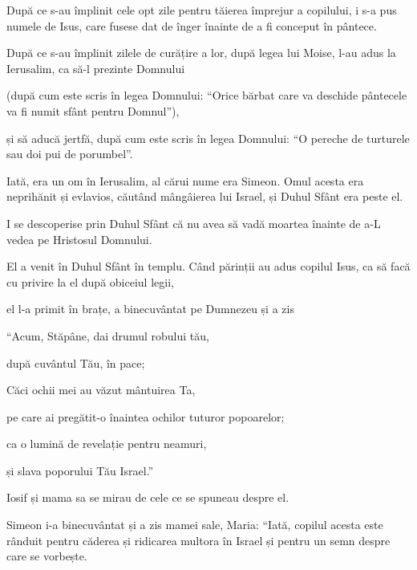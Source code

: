 {\par }{\PP {}După ce s-au împlinit cele opt zile pentru tăierea împrejur a copilului, i s-a pus numele de Isus, care fusese dat de înger înainte de a fi conceput în pântece.


\par }{\PP {}După ce s-au împlinit zilele de curățire a lor, după legea lui Moise, l-au adus la Ierusalim, ca să-l prezinte Domnului

(după cum este scris în legea Domnului: “Orice bărbat care va deschide pântecele va fi numit sfânt pentru Domnul”),

și să aducă jertfă, după cum este scris în legea Domnului: “O pereche de turturele sau doi pui de porumbel”.


\par }{\PP {}Iată, era un om în Ierusalim, al cărui nume era Simeon. Omul acesta era neprihănit și evlavios, căutând mângâierea lui Israel, și Duhul Sfânt era peste el.

I se descoperise prin Duhul Sfânt că nu avea să vadă moartea înainte de a-L vedea pe Hristosul Domnului.

El a venit în Duhul Sfânt în templu. Când părinții au adus copilul Isus, ca să facă cu privire la el după obiceiul legii,

el l-a primit în brațe, a binecuvântat pe Dumnezeu și a zis


\par }{\Q {}“Acum, Stăpâne, dai drumul robului tău,

\par }{\QB după cuvântul Tău, în pace;


\par }{\Q {}Căci ochii mei au văzut mântuirea Ta,


\par }{\QB {}pe care ai pregătit-o înaintea ochilor tuturor popoarelor;


\par }{\Q {}ca o lumină de revelație pentru neamuri,

\par }{\QB și slava poporului Tău Israel.”


\par }{\PP {}Iosif și mama sa se mirau de cele ce se spuneau despre el.

Simeon i-a binecuvântat și a zis mamei sale, Maria: “Iată, copilul acesta este rânduit pentru căderea și ridicarea multora în Israel și pentru un semn despre care se vorbește.

}
